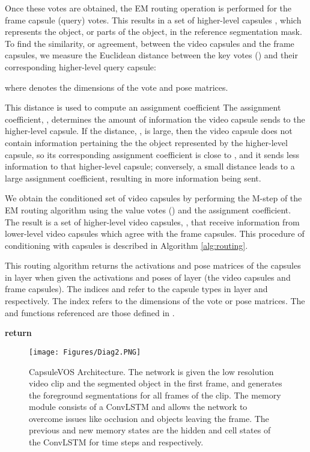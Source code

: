 \documentclass[10pt,twocolumn,letterpaper]{article}
\begin{document}
Once these votes are obtained, the EM routing operation is performed for the frame capsule (query) votes. This results in a set of higher-level capsules , which represents the object, or parts of the object, in the reference segmentation mask. To find the similarity, or agreement, between the video capsules and the frame capsules, we  measure the Euclidean distance between the key votes () and their corresponding higher-level query capsule:

where  denotes the dimensions of the vote and pose matrices.

This distance is used to compute an assignment coefficient 
The assignment coefficient, , determines the amount of information the  video capsule sends to the  higher-level capsule. If the distance, , is large, then the  video capsule does not contain information pertaining the the object represented by the  higher-level capsule, so its corresponding assignment coefficient is close to , and it sends less information to that higher-level capsule; conversely, a small distance leads to a large assignment coefficient, resulting in more information being sent.

We obtain the conditioned set of video capsules by performing the M-step of the EM routing algorithm using the value votes () and the assignment coefficient. The result is a set of higher-level video capsules, , that receive information from lower-level video capsules which agree with the frame capsules. This procedure of conditioning with capsules is described in Algorithm \ref{alg:routing}.
\begin{algorithm}
\caption{This routing algorithm returns the activations and pose matrices of the capsules in layer  when given the activations and poses of layer  (the video capsules and frame capsules). The indices  and  refer to the capsule types in layer  and  respectively. The index  refers to the dimensions of the vote or pose matrices. The  and  functions referenced are those defined in \cite{hinton2018matrix}.}\label{alg:routing}
\begin{algorithmic}[1]
\State 
\State 
\State 
\State 
\State  {}
\State   {}
\State  {}
\State \textbf{return} 
\EndProcedure
\end{algorithmic}
\end{algorithm}




\begin{figure*}[t]
\centering
\texttt{[image: Figures/Diag2.PNG]}
   \caption{CapsuleVOS Architecture. The network is given the low resolution video clip and the segmented object in the first frame, and generates the foreground segmentations for all frames of the clip. The memory module consists of a ConvLSTM and allows the network to overcome issues like occlusion and objects leaving the frame. The previous and new memory states are the hidden and cell states of the ConvLSTM for time steps  and  respectively.}
\label{fig:network}
\end{figure*} 
\end{document}
